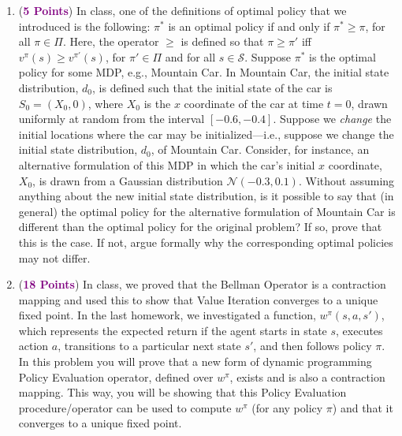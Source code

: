 \documentclass{article}
\newcommand{\POINTS}[1]{\textcolor{purple}{\textbf{{#1}}}}
\begin{document}
\begin{enumerate}
    
    \vspace{0.8cm}
    \item (\POINTS{5 Points}) In class, one of the definitions of optimal policy that we introduced is the following: $\pi^*$ is an optimal policy if and only if $\pi^* \geq \pi$, for all $\pi \in \Pi$. Here, the operator $\geq$ is defined so that $\pi \geq \pi'$ iff $v^\pi(s) \geq v^{\pi'}(s)$, for $\pi' \in \Pi$ and for all $s \in \mathcal{S}$. Suppose $\pi^*$ is the optimal policy for some MDP, e.g., Mountain Car. In Mountain Car, the initial state distribution, $d_0$, is defined such that the initial state of the car is $S_0=(X_0,0)$, where $X_0$ is the $x$ coordinate of the car at time $t=0$, drawn uniformly at random from the interval $[-0.6, -0.4]$. Suppose we \textit{change} the initial locations where the car may be initialized---i.e., suppose we change the initial state distribution, $d_0$, of Mountain Car. Consider, for instance, an alternative formulation of this MDP in which the car's initial $x$ coordinate, $X_0$, is drawn from a Gaussian distribution $\mathcal{N}(-0.3, 0.1)$. Without assuming anything about the new initial state distribution, is it possible to say that (in general) the optimal policy for the alternative formulation of Mountain Car is different than the optimal policy for the original problem? If so, prove that this is the case. If not, argue formally why the corresponding optimal policies may not differ.
    
    
    \newpage
    \item (\POINTS{18 Points}) In class, we proved that the Bellman Operator is a contraction mapping and used this to show that Value Iteration converges to a unique fixed point. In the last homework, we investigated a function, $w^\pi(s, a, s')$, which represents the expected return if the agent starts in state $s$, executes action $a$, transitions to a particular next state $s'$, and then follows policy $\pi$. In this problem you will prove that a new form of dynamic programming Policy Evaluation operator, defined over $w^\pi$,  exists and is also a contraction mapping. This way, you will be showing that this Policy Evaluation procedure/operator can be used to compute $w^\pi$ (for any policy $\pi$) and that it converges to a unique fixed point.
    

\end{enumerate}
\end{document}
